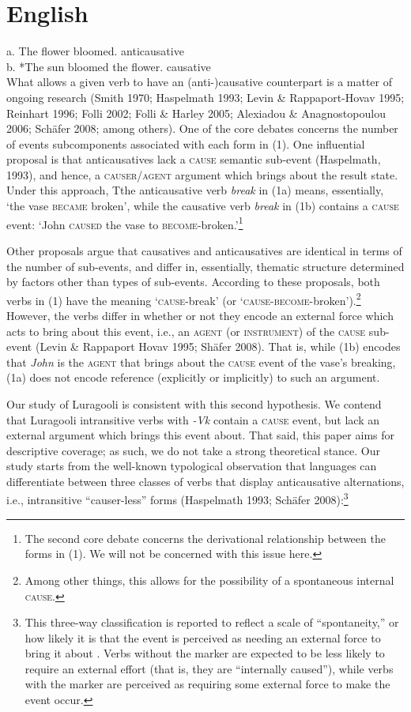 \documentclass[output=paper]{langsci/langscibook}
\begin{document}
\chapter[  English]{  English}
\gll a.  The flower bloomed.        anticausative\\
\gll b.  *The sun bloomed the flower.      causative\\
What allows a given verb to have an (anti-)causative counterpart is a matter of ongoing research (Smith 1970; Haspelmath 1993; Levin \& Rappaport-Hovav 1995; Reinhart 1996; Folli 2002; Folli \& Harley 2005; Alexiadou \& Anagnostopoulou 2006; Schäfer 2008; among others). One of the core debates concerns the number of events subcomponents associated with each form in (1). One influential proposal is that anticausatives lack a \textsc{cause} semantic sub-event (Haspelmath, 1993), and hence, a \textsc{causer/agent} argument which brings about the result state. Under this approach, Tthe anticausative verb \textit{break} in (1a) means, essentially, ‘the vase \textsc{became} broken’, while the causative verb \textit{break} in (1b) contains a \textsc{cause} event: ‘John \textsc{caused} the vase to \textsc{become}{}-broken.’\footnote{The second core debate concerns the derivational relationship between the forms in (1). We will not be concerned with this issue here.}

Other proposals argue that causatives and anticausatives are identical in terms of the number of sub-events, and differ in, essentially, thematic structure determined by factors other than types of sub-events. According to these proposals, both verbs in (1) have the meaning ‘\textsc{cause}{}-break’ (or ‘\textsc{cause-become}{}-broken’).\footnote{ Among other things, this allows for the possibility of a spontaneous internal \textsc{cause.}} However, the verbs differ in whether or not they encode an external force which acts to bring about this event, i.e., an \textsc{agent (}or \textsc{instrument}) of the \textsc{cause} sub-event (Levin \& Rappaport Hovav 1995; Shäfer 2008). That is, while (1b) encodes that \textit{John }is the\textsc{ agent} that brings about the \textsc{cause} event of the vase’s breaking, (1a) does not encode reference (explicitly or implicitly) to such an argument. 

  Our study of Luragooli is consistent with this second hypothesis. We contend that Luragooli intransitive verbs with \textit{{}-Vk} contain a \textsc{cause} event, but lack an external argument which brings this event about. That said, this paper aims for descriptive coverage; as such, we do not take a strong theoretical stance. Our study starts from the well-known typological observation that languages can differentiate between three classes of verbs that display anticausative alternations, i.e., intransitive “causer-less” forms (Haspelmath 1993; Schäfer 2008):\footnote{ This three-way classification is reported to reflect a scale of “spontaneity,” or how likely it is that the event is perceived as needing an external force to bring it about \citep{Haspelmath1993}. Verbs without the marker are expected to be less likely to require an external effort (that is, they are “internally caused”), while verbs with the marker are perceived as requiring some external force to make the event occur. }
\end{document}
